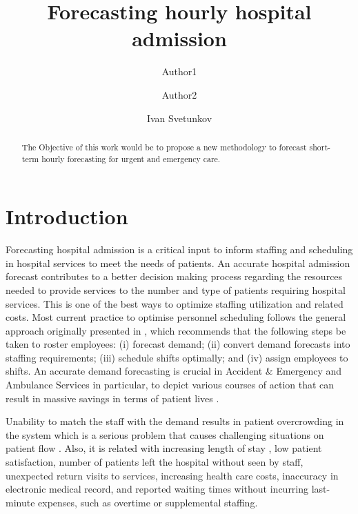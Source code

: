 \documentclass[]{elsarticle} %
\begin{document}
\begin{frontmatter}

  \title{Forecasting hourly hospital admission}
    \author[University1]{Author1}
    \author[University2]{Author2}
    \author[Centre for Marketing Analytics and Forecasting, Lancaster University, UK]{Ivan Svetunkov}
      \address[University1]{Cardiff business school, 3 Colum Drive, CF10 3EU, Cardiff}
    \address[University2]{adress2}
    \address[University3]{adress3}
  
  \begin{abstract}
  The Objective of this work would be to propose a new methodology to forecast short-term hourly forecasting for urgent and emergency care.
  \end{abstract}
  
 \end{frontmatter}

\hypertarget{introduction}{%
\section{Introduction}\label{introduction}}

Forecasting hospital admission is a critical input to inform staffing and scheduling in hospital services to meet the needs of patients. An accurate hospital admission forecast contributes to a better decision making process regarding the resources needed to provide services to the number and type of patients requiring hospital services. This is one of the best ways to optimize staffing utilization and related costs. Most current practice to optimise personnel scheduling follows the general approach originally presented in \citet{vile2016time}, which recommends that the following steps be taken to roster employees: (i) forecast demand; (ii) convert demand forecasts into staffing requirements; (iii) schedule shifts optimally; and (iv) assign employees to shifts. An accurate demand forecasting is crucial in Accident \& Emergency and Ambulance Services in particular, to depict various courses of action that can result in massive savings in terms of patient lives \citep{rostami2020anticipating}.

Unability to match the staff with the demand results in patient overcrowding in the system which is a serious problem that causes challenging situations on patient flow \citep{derlet2002overcrowding}. Also, it is related with increasing length of stay \citep{muhammet2015forecasting}, low patient satisfaction, number of patients left the hospital without seen by staff, unexpected return visits to services, increasing health care costs, inaccuracy in electronic medical record, and reported waiting times without incurring last-minute expenses, such as overtime or supplemental staffing.
\end{document}
